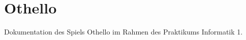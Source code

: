\chapter{Othello}
\hypertarget{index}{}\label{index}
Dokumentation des Spiels Othello im Rahmen des Praktikums Informatik 1. 